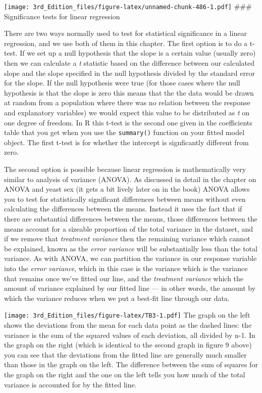 \documentclass[
]{book}
\begin{document}
\texttt{[image: 3rd\_Edition\_files/figure-latex/unnamed-chunk-486-1.pdf]}
\#\#\# Significance tests for linear regression

There are two ways normally used to test for statistical significance in a linear regression, and we use both of them in this chapter. The first option is to do a t-test. If we set up a null hypothesis that the slope is a certain value (usually zero) then we can calculate a \emph{t} statistic based on the difference between our calculated slope and the slope specified in the null hypothesis divided by the standard error for the slope. If the null hypothesis were true (for those cases where the null hypothesis is that the slope is zero this means that the the data would be drawn at random from a population where there was no relation between the response and explanatory variables) we would expect this value to be distributed as \emph{t} on one degree of freedom. In R this t-test is the second one given in the coefficients table that you get when you use the \texttt{summary()} function on your fitted model object. The first t-test is for whether the intercept is signficantly different from zero.

The second option is possible because linear regression is mathematically very similar to analysis of variance (ANOVA). As discussed in detail in the chapter on ANOVA and yeast sex (it gets a bit lively later on in the book) ANOVA allows you to test for statistically significant differences between means without even calculating the differences between the means. Instead it uses the fact that if there are substantial differences between the means, those differences between the means account for a sizeable proportion of the total variance in the dataset, and if we remove that \emph{treatment variance} then the remaining variance which cannot be explained, known as the \emph{error variance} will be substantially less than the total variance. As with ANOVA, we can partition the variance in our response variable into the \emph{error variance}, which in this case is the variance which is the variance that remains once we've fitted our line, and the \emph{treatment variance} which the amount of variance explained by our fitted line --- in other words, the amount by which the variance reduces when we put a best-fit line through our data.

\texttt{[image: 3rd\_Edition\_files/figure-latex/TB3-1.pdf]}
The graph on the left shows the deviations from the mean for each data point as the dashed lines: the variance is the sum of the squared values of each deviation, all divided by n-1. In the graph on the right (which is identical to the second graph in figure 9 above) you can see that the deviations from the fitted line are generally much smaller than those in the graph on the left. The difference between the sum of squares for the graph on the right and the one on the left tells you how much of the total variance is accounted for by the fitted line.
\end{document}
